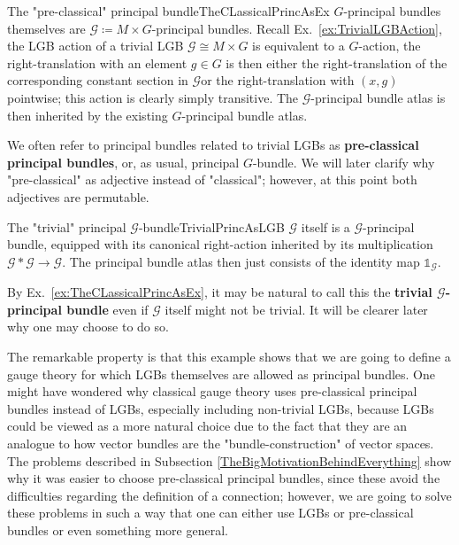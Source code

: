 \documentclass[a4paper,oneside,11pt,bibliography=totoc]{scrartcl}
\theoremstyle{plain}
\theoremstyle{remark}
\theoremstyle{definition}
\begin{document}
\begin{examples}{The "pre-classical" principal bundle}{TheCLassicalPrincAsEx}
$G$-principal bundles themselves are $\mathcal{G} \coloneqq M \times G$-principal bundles. Recall Ex.\ \ref{ex:TrivialLGBAction}, the LGB action of a trivial LGB $\mathcal{G} \cong M \times G$ is equivalent to a $G$-action, the right-translation with an element $g \in G$ is then either the right-translation of the corresponding constant section in $\mathcal{G}$or the right-translation with $(x, g)$ pointwise; this action is clearly simply transitive. The $\mathcal{G}$-principal bundle atlas is then inherited by the existing $G$-principal bundle atlas.

We often refer to principal bundles related to trivial LGBs as \textbf{pre-classical principal bundles}, or, as usual, principal $G$-bundle. We will later clarify why "pre-classical" as adjective instead of "classical"; however, at this point both adjectives are permutable.
\end{examples}

\begin{examples}{The "trivial" principal $\mathcal{G}$-bundle}{TrivialPrincAsLGB}
$\mathcal{G}$ itself is a $\mathcal{G}$-principal bundle, equipped with its canonical right-action inherited by its multiplication $\mathcal{G}*\mathcal{G} \to \mathcal{G}$. The principal bundle atlas then just consists of the identity map $\mathds{1}_{\mathcal{G}}$.

By Ex.\ \ref{ex:TheCLassicalPrincAsEx}, it may be natural to call this the \textbf{trivial $\mathcal{G}$-principal bundle} even if $\mathcal{G}$ itself might not be trivial. It will be clearer later why one may choose to do so.

The remarkable property is that this example shows that we are going to define a gauge theory for which LGBs themselves are allowed as principal bundles. One might have wondered why classical gauge theory uses pre-classical principal bundles instead of LGBs, especially including non-trivial LGBs, because LGBs could be viewed as a more natural choice due to the fact that they are an analogue to how vector bundles are the "bundle-construction" of vector spaces. The problems described in Subsection \ref{TheBigMotivationBehindEverything} show why it was easier to choose pre-classical principal bundles, since these avoid the difficulties regarding the definition of a connection; however, we are going to solve these problems in such a way that one can either use LGBs or pre-classical bundles or even something more general.
\end{examples}
\end{document}
